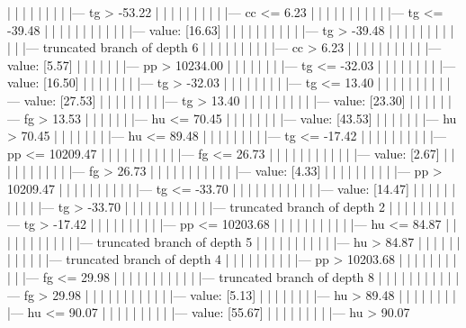 \documentclass[UTF8, a4paper]{ctexart}
\begin{document}
|   |   |   |   |   |   |   |   |--- tg >  -53.22
|   |   |   |   |   |   |   |   |   |--- cc <= 6.23
|   |   |   |   |   |   |   |   |   |   |--- tg <= -39.48
|   |   |   |   |   |   |   |   |   |   |   |--- value: [16.63]
|   |   |   |   |   |   |   |   |   |   |--- tg >  -39.48
|   |   |   |   |   |   |   |   |   |   |   |--- truncated branch of depth 6
|   |   |   |   |   |   |   |   |   |--- cc >  6.23
|   |   |   |   |   |   |   |   |   |   |--- value: [5.57]
|   |   |   |   |   |   |--- pp >  10234.00
|   |   |   |   |   |   |   |--- tg <= -32.03
|   |   |   |   |   |   |   |   |--- value: [16.50]
|   |   |   |   |   |   |   |--- tg >  -32.03
|   |   |   |   |   |   |   |   |--- tg <= 13.40
|   |   |   |   |   |   |   |   |   |--- value: [27.53]
|   |   |   |   |   |   |   |   |--- tg >  13.40
|   |   |   |   |   |   |   |   |   |--- value: [23.30]
|   |   |   |   |   |--- fg >  13.53
|   |   |   |   |   |   |--- hu <= 70.45
|   |   |   |   |   |   |   |--- value: [43.53]
|   |   |   |   |   |   |--- hu >  70.45
|   |   |   |   |   |   |   |--- hu <= 89.48
|   |   |   |   |   |   |   |   |--- tg <= -17.42
|   |   |   |   |   |   |   |   |   |--- pp <= 10209.47
|   |   |   |   |   |   |   |   |   |   |--- fg <= 26.73
|   |   |   |   |   |   |   |   |   |   |   |--- value: [2.67]
|   |   |   |   |   |   |   |   |   |   |--- fg >  26.73
|   |   |   |   |   |   |   |   |   |   |   |--- value: [4.33]
|   |   |   |   |   |   |   |   |   |--- pp >  10209.47
|   |   |   |   |   |   |   |   |   |   |--- tg <= -33.70
|   |   |   |   |   |   |   |   |   |   |   |--- value: [14.47]
|   |   |   |   |   |   |   |   |   |   |--- tg >  -33.70
|   |   |   |   |   |   |   |   |   |   |   |--- truncated branch of depth 2
|   |   |   |   |   |   |   |   |--- tg >  -17.42
|   |   |   |   |   |   |   |   |   |--- pp <= 10203.68
|   |   |   |   |   |   |   |   |   |   |--- hu <= 84.87
|   |   |   |   |   |   |   |   |   |   |   |--- truncated branch of depth 5
|   |   |   |   |   |   |   |   |   |   |--- hu >  84.87
|   |   |   |   |   |   |   |   |   |   |   |--- truncated branch of depth 4
|   |   |   |   |   |   |   |   |   |--- pp >  10203.68
|   |   |   |   |   |   |   |   |   |   |--- fg <= 29.98
|   |   |   |   |   |   |   |   |   |   |   |--- truncated branch of depth 8
|   |   |   |   |   |   |   |   |   |   |--- fg >  29.98
|   |   |   |   |   |   |   |   |   |   |   |--- value: [5.13]
|   |   |   |   |   |   |   |--- hu >  89.48
|   |   |   |   |   |   |   |   |--- hu <= 90.07
|   |   |   |   |   |   |   |   |   |--- value: [55.67]
|   |   |   |   |   |   |   |   |--- hu >  90.07
\end{document}
